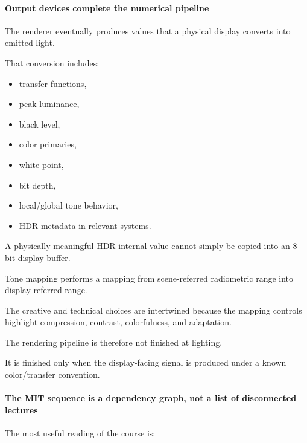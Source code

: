 \paragraph{Output devices complete the numerical pipeline}\label{output-devices-complete-the-numerical-pipeline}

The renderer eventually produces values that a physical display converts into emitted light.

That conversion includes:

\begin{itemize}
\tightlist
\item
  transfer functions,
\item
  peak luminance,
\item
  black level,
\item
  color primaries,
\item
  white point,
\item
  bit depth,
\item
  local/global tone behavior,
\item
  HDR metadata in relevant systems.
\end{itemize}

A physically meaningful HDR internal value cannot simply be copied into an 8-bit display buffer.

Tone mapping performs a mapping from scene-referred radiometric range into display-referred range.

The creative and technical choices are intertwined because the mapping controls highlight compression, contrast, colorfulness, and adaptation.

The rendering pipeline is therefore not finished at lighting.

It is finished only when the display-facing signal is produced under a known color/transfer convention.

\paragraph{The MIT sequence is a dependency graph, not a list of disconnected lectures}\label{the-mit-sequence-is-a-dependency-graph-not-a-list-of-disconnected-lectures}

The most useful reading of the course is:

